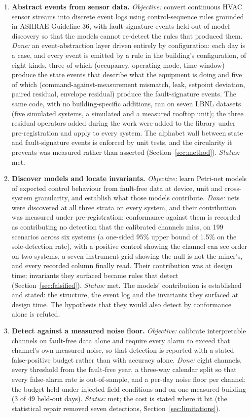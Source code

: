 \documentclass[11pt,letterpaper]{article}
\begin{document}
\begin{enumerate}
\item \textbf{Abstract events from sensor data.} \emph{Objective:} convert continuous HVAC sensor streams into discrete event logs using control-sequence rules grounded in ASHRAE Guideline 36, with fault-signature events held out of model discovery so that the models cannot re-detect the rules that produced them. \emph{Done:} an event-abstraction layer driven entirely by configuration: each day is a case, and every event is emitted by a rule in the building's configuration, of eight kinds, three of which (occupancy, operating mode, time window) produce the state events that describe what the equipment is doing and five of which (command-against-measurement mismatch, leak, setpoint deviation, paired residual, envelope residual) produce the fault-signature events. The same code, with no building-specific additions, ran on seven LBNL datasets (five simulated systems, a simulated and a measured rooftop unit); the three residual operators added during the work were added to the library under pre-registration and apply to every system. The alphabet wall between state and fault-signature events is enforced by unit tests, and the circularity it prevents was measured rather than asserted (Section~\ref{sec:method}). \emph{Status:} met.

\item \textbf{Discover models and locate invariants.} \emph{Objective:} learn Petri-net models of expected control behaviour from fault-free data at device, unit and cross-system granularity, and establish what those models contribute. \emph{Done:} nets were discovered at all three strata on every system, and their contribution was measured under pre-registration: conformance against them is recorded as contributing no detection that the calibrated channels miss, on 199 scenarios across six systems (a one-sided 95\% upper bound of 1.5\% on the sole-detection rate), with a positive control showing the channel can see order on two systems, a seven-instrument grid showing the null is not the miner's, and every recorded column finally read. Their contribution was at design time: invariants they surfaced became rules that detect (Section~\ref{sec:falsified}). \emph{Status:} met. The models' contribution is established and stated: the structure, the event log and the invariants they surfaced at design time. The hypothesis that they would also detect by conformance alone is refuted.

\item \textbf{Detect against a measured noise floor.} \emph{Objective:} calibrate interpretable channels on fault-free data alone and require every alarm to exceed that channel's own measured noise, so that detection is reported with a stated false-positive budget rather than with accuracy alone. \emph{Done:} eight channels, every threshold from the fault-free year, a three-way calendar split so that every false-alarm rate is out-of-sample, and a per-day noise floor per channel; the budget held under injected field conditions and on one measured building (3 of 49 held-out days). \emph{Status:} met; the cost is stated where it bit (the statistical repair removed seven detections, Section~\ref{sec:limitations}).


\end{enumerate}
\end{document}
